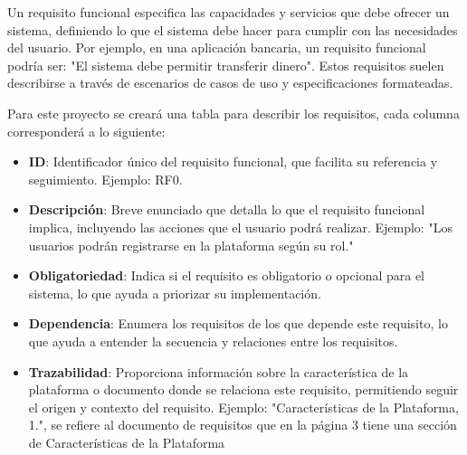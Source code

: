 \documentclass{article}
\begin{document}
	Un requisito funcional especifica las capacidades y servicios que debe ofrecer un sistema, definiendo lo que el sistema debe hacer para cumplir con las necesidades del usuario. Por ejemplo, en una aplicación bancaria, un requisito funcional podría ser: "El sistema debe permitir transferir dinero". Estos requisitos suelen describirse a través de escenarios de casos de uso y especificaciones formateadas.
	
	
	Para este proyecto se creará una tabla para describir los requisitos, cada columna corresponderá a lo siguiente:
	
	
	\begin{itemize}
		\item \textbf{ID}: Identificador único del requisito funcional, que facilita su referencia y seguimiento. Ejemplo: RF0.
		
		\item \textbf{Descripción}: Breve enunciado que detalla lo que el requisito funcional implica, incluyendo las acciones que el usuario podrá realizar. Ejemplo: "Los usuarios podrán registrarse en la plataforma según su rol."
		
		\item \textbf{Obligatoriedad}: Indica si el requisito es obligatorio o opcional para el sistema, lo que ayuda a priorizar su implementación. 
		
		\item \textbf{Dependencia}: Enumera los requisitos de los que depende este requisito, lo que ayuda a entender la secuencia y relaciones entre los requisitos.
		
		\item \textbf{Trazabilidad}: Proporciona información sobre la característica de la plataforma o documento donde se relaciona este requisito, permitiendo seguir el origen y contexto del requisito. Ejemplo: "Características de la Plataforma, 1.", se refiere al documento de requisitos que en la página 3 tiene una sección de Características de la Plataforma 
	\end{itemize}
	
\end{document}
